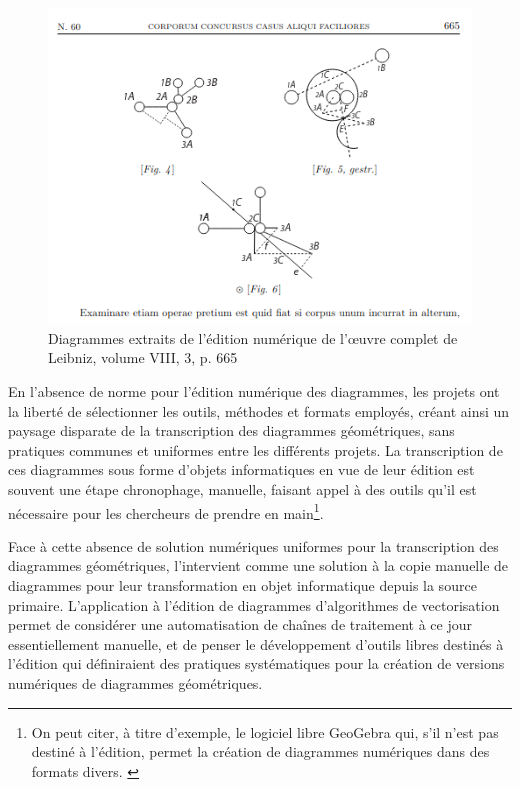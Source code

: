 		\begin{figure}[h]
			\centering
			\includegraphics[width=15cm]{images/leibniz_diag.png}
			\caption{Diagrammes extraits de l'édition numérique de l'œuvre complet de Leibniz, volume VIII, 3, p. 665}
			\label{fig:leibniz_diag}
		\end{figure}
	
		En l'absence de norme pour l'édition numérique des diagrammes, les projets ont la liberté de sélectionner les outils, méthodes et formats employés, créant ainsi un paysage disparate de la transcription des diagrammes géométriques, sans pratiques communes et uniformes entre les différents projets. La transcription de ces diagrammes sous forme d'objets informatiques en vue de leur édition est souvent une étape chronophage, manuelle, faisant appel à des outils qu'il est nécessaire pour les chercheurs de prendre en main\footnote{On peut citer, à titre d'exemple, le logiciel libre GeoGebra qui, s'il n'est pas destiné à l'édition, permet la création de diagrammes numériques dans des formats divers. \cite{GeoGebra}}.
		
		Face à cette absence de solution numériques uniformes pour la transcription des diagrammes géométriques, l'\ia intervient comme une solution à la copie manuelle de diagrammes pour leur transformation en objet informatique depuis la source primaire. L'application à l'édition de diagrammes d'algorithmes de vectorisation permet de considérer une automatisation de chaînes de traitement à ce jour essentiellement manuelle, et de penser le développement d'outils libres destinés à l'édition qui définiraient des pratiques systématiques pour la création de versions numériques de diagrammes géométriques.

